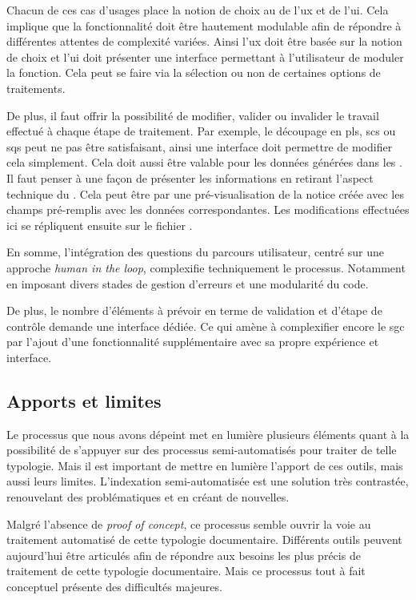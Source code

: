 Chacun de ces cas d'usages place la notion de choix au \coeur de l'\gls{ux} et de l'\gls{ui}. Cela implique que la fonctionnalité doit être hautement modulable afin de répondre à différentes attentes de complexité variées. Ainsi l'\gls{ux} doit être basée sur la notion de choix et l'\gls{ui} doit présenter une interface permettant à l'utilisateur de moduler la fonction. Cela peut se faire via la sélection ou non de certaines options de traitements.\newline

De plus, il faut offrir la possibilité de modifier, valider ou invalider le travail effectué à chaque étape de traitement. Par exemple, le découpage en \glspl{pl}, \glspl{sc} ou \glspl{sq} peut ne pas être satisfaisant, ainsi une interface doit permettre de modifier cela simplement. Cela doit aussi être valable pour les données générées dans les \J. Il faut penser à une façon de présenter les informations en retirant l'aspect technique du \J. Cela peut être par une pré-visualisation de la notice créée avec les champs pré-remplis avec les données correspondantes. Les modifications effectuées ici se répliquent ensuite sur le fichier \J.

En somme, l'intégration des questions du parcours utilisateur, centré sur une approche \textit{human in the loop}, complexifie techniquement le processus. Notamment en imposant divers stades de gestion d'erreurs et une modularité du code. 

De plus, le nombre d'éléments à prévoir en terme de validation et d'étape de contrôle demande une interface dédiée. Ce qui amène à complexifier encore le \gls{sgc} par l'ajout d'une fonctionnalité supplémentaire avec sa propre expérience et interface. 

\subsection{Apports et limites}

Le processus que nous avons dépeint met en lumière plusieurs éléments quant à la possibilité de s'appuyer sur des processus semi-automatisés pour traiter de telle typologie. Mais il est important de mettre en lumière l'apport de ces outils, mais aussi leurs limites. L'indexation semi-automatisée est une solution très contrastée, renouvelant des problématiques et en créant de nouvelles. 

Malgré l'absence de \textit{proof of concept}, ce processus semble ouvrir la voie au traitement automatisé de cette typologie documentaire. Différents outils peuvent aujourd'hui être articulés afin de répondre aux besoins les plus précis de traitement de cette typologie documentaire. Mais ce processus tout à fait conceptuel présente des difficultés majeures.\newline

